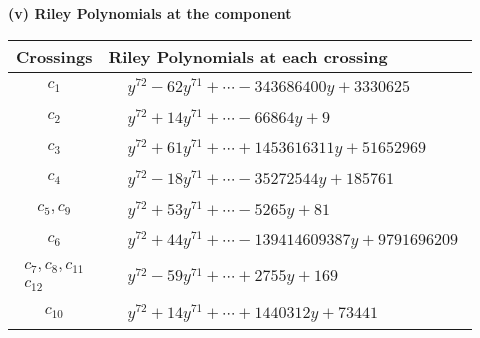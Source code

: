 \documentclass[1p]{elsarticle_modified}
\theoremstyle{definition}
\begin{document}
\newpage\renewcommand{\arraystretch}{1}
\flushleft \textbf{(v) Riley Polynomials at the component}\newline \\
\begin{tabular}{m{50pt}|m{274pt}}
Crossings & \hspace{64pt}Riley Polynomials at each crossing \\
\hline $$\begin{aligned}c_{1}\end{aligned}$$&$\begin{aligned}
&y^{72}-62 y^{71}+\cdots-343686400 y+3330625
\end{aligned}$\\
\hline $$\begin{aligned}c_{2}\end{aligned}$$&$\begin{aligned}
&y^{72}+14 y^{71}+\cdots-66864 y+9
\end{aligned}$\\
\hline $$\begin{aligned}c_{3}\end{aligned}$$&$\begin{aligned}
&y^{72}+61 y^{71}+\cdots+1453616311 y+51652969
\end{aligned}$\\
\hline $$\begin{aligned}c_{4}\end{aligned}$$&$\begin{aligned}
&y^{72}-18 y^{71}+\cdots-35272544 y+185761
\end{aligned}$\\
\hline $$\begin{aligned}c_{5},c_{9}\end{aligned}$$&$\begin{aligned}
&y^{72}+53 y^{71}+\cdots-5265 y+81
\end{aligned}$\\
\hline $$\begin{aligned}c_{6}\end{aligned}$$&$\begin{aligned}
&y^{72}+44 y^{71}+\cdots-139414609387 y+9791696209
\end{aligned}$\\
\hline $$\begin{aligned}c_{7},c_{8},c_{11}\\c_{12}\end{aligned}$$&$\begin{aligned}
&y^{72}-59 y^{71}+\cdots+2755 y+169
\end{aligned}$\\
\hline $$\begin{aligned}c_{10}\end{aligned}$$&$\begin{aligned}
&y^{72}+14 y^{71}+\cdots+1440312 y+73441
\end{aligned}$\\
\hline
\end{tabular}\\~\\
\end{document}

